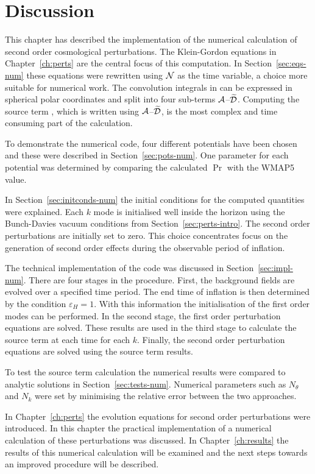 \section{Discussion}
\label{sec:disc-numerical}
This chapter has described the implementation of the numerical calculation of second
order cosmological perturbations.
The Klein-Gordon equations in Chapter~\ref{ch:perts} are the central focus of this
computation. In Section~\ref{sec:eqs-num} these equations were rewritten using $\mathcal{N}$
as the time variable, a choice more suitable for numerical work. The convolution
integrals in  can be expressed in spherical polar
coordinates and split into four sub-terms $\mathcal{A}$--$\widetilde{\mathcal{D}}$. Computing the source term
, which is written using $\mathcal{A}$--$\widetilde{\mathcal{D}}$, is the most complex
and
time consuming part of the calculation.

To demonstrate the numerical code, four different potentials have been chosen and
these were described in Section~\ref{sec:pots-num}. One parameter for each
potential was determined by comparing the calculated $\Pr$ with the WMAP5 value.

In Section~\ref{sec:initconds-num} the initial conditions for the computed
quantities were explained. Each $k$ mode is initialised well inside the horizon
using the Bunch-Davies vacuum conditions from Section~\ref{sec:perts-intro}. The
second order perturbations are initially set to zero. This choice
concentrates focus
on the generation of second order effects during the observable period of
inflation.


The technical implementation of the code was discussed in
Section~\ref{sec:impl-num}. There are four stages in the procedure. First, the
background fields are evolved over a specified time period. The end time of
inflation is then determined by the condition $\varepsilon_H=1$. With this
information the initialisation of the first order modes can be performed. In the
second stage, the first order perturbation equations are solved. These results are
used in the third stage to calculate the source term  at each
time for each $k$. Finally, the second order perturbation equations are solved using
the source term results.

To test the source term calculation the numerical results were compared to 
analytic solutions in Section~\ref{sec:tests-num}. Numerical parameters such as
$N_\theta$ and $N_k$ were set by minimising the relative error between the two
approaches.

In Chapter~\ref{ch:perts} the evolution equations for second order perturbations
were introduced. In this chapter the practical implementation of a numerical
calculation of these perturbations was discussed. In Chapter~\ref{ch:results} the
results of this numerical calculation will be examined and the next steps towards an
improved procedure will be described.